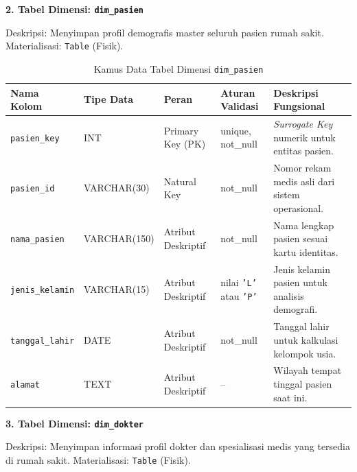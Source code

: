 \textbf{2. Tabel Dimensi: \texttt{dim\_pasien}}
 
Deskripsi: Menyimpan profil demografis master seluruh pasien rumah sakit. Materialisasi: \texttt{Table} (Fisik).
 
\begin{table}[H]
\centering
\caption{Kamus Data Tabel Dimensi \texttt{dim\_pasien}}
\small
\begin{tabularx}{\linewidth}{p{2.8cm}p{2cm}p{2.8cm}p{2.8cm}X}
\toprule
\textbf{Nama Kolom} & \textbf{Tipe Data} & \textbf{Peran} & \textbf{Aturan Validasi} & \textbf{Deskripsi Fungsional} \\
\midrule
\texttt{pasien\_key}    & INT          & Primary Key (PK)   & unique, not\_null                          & \textit{Surrogate Key} numerik untuk entitas pasien. \\
\texttt{pasien\_id}     & VARCHAR(30)  & Natural Key        & not\_null                                  & Nomor rekam medis asli dari sistem operasional. \\
\texttt{nama\_pasien}   & VARCHAR(150) & Atribut Deskriptif & not\_null                                  & Nama lengkap pasien sesuai kartu identitas. \\
\texttt{jenis\_kelamin} & VARCHAR(15)  & Atribut Deskriptif & nilai \texttt{'L'} atau \texttt{'P'}        & Jenis kelamin pasien untuk analisis demografi. \\
\texttt{tanggal\_lahir} & DATE         & Atribut Deskriptif & not\_null                                  & Tanggal lahir untuk kalkulasi kelompok usia. \\
\texttt{alamat}         & TEXT         & Atribut Deskriptif & --                                         & Wilayah tempat tinggal pasien saat ini. \\
\bottomrule
\end{tabularx}
\end{table}
 
\textbf{3. Tabel Dimensi: \texttt{dim\_dokter}}
 
Deskripsi: Menyimpan informasi profil dokter dan spesialisasi medis yang tersedia di rumah sakit. Materialisasi: \texttt{Table} (Fisik).
 
